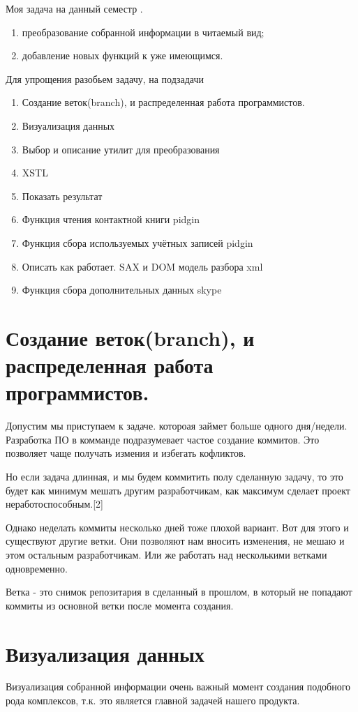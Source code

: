 \newpage
Моя задача на данный семестр . \\
\begin{enumerate}
\item преобразование собранной информации в читаемый вид;
\item добавление новых функций к уже имеющимся.
\end{enumerate}
Для упрощения разобьем задачу, на подзадачи
\begin{enumerate}
\item Создание веток(branch), и распределенная работа программистов. 
\item Визуализация данных
\item Выбор и описание утилит для преобразования
\item XSTL
\item Показать результат
\item Функция чтения контактной книги pidgin
\item Функция сбора используемых учётных записей pidgin
\item Описать как работает. SAX и DOM модель разбора xml
\item Функция сбора дополнительных данных skype
\end{enumerate}
\chapter*{Создание веток(branch), и распределенная работа программистов.}
Допустим мы приступаем к задаче. котороая займет больше одного дня/недели. Разработка ПО в комманде подразумевает частое создание коммитов. Это позволяет чаще получать измения и избегать кофликтов. 

Но если задача длинная, и мы будем коммитить полу сделанную задачу, то это будет как минимум мешать другим разработчикам, как максимум сделает проект неработоспособным.[2]

Однако неделать коммиты несколько дней тоже плохой вариант. Вот для этого и существуют другие ветки. Они позволяют нам вносить изменения, не мешаю и этом остальным разработчикам. Или же работать над несколькими ветками одновременно.

Ветка - это снимок репозитария в сделанный в прошлом, в который не попадают коммиты из основной ветки после момента создания.

\chapter*{Визуализация данных}
Визуализация собранной информации очень важный момент создания подобного рода комплексов, т.к. это является главной задачей нашего продукта. 

